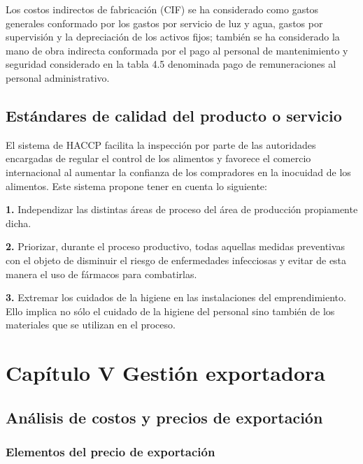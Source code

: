 \documentclass[
  stu,
  floatsintext,
  longtable,
  a4paper,
  nolmodern,
  notxfonts,
  notimes,
  12pt,
  colorlinks=true,linkcolor=blue,citecolor=blue,urlcolor=blue]{apa7}
\begin{document}
Los costos indirectos de fabricación (CIF) se ha considerado como gastos
generales conformado por los gastos por servicio de luz y agua, gastos
por supervisión y la depreciación de los activos fijos; también se ha
considerado la mano de obra indirecta conformada por el pago al personal
de mantenimiento y seguridad considerado en la tabla 4.5 denominada pago
de remuneraciones al personal administrativo.

\subsection{Estándares de calidad del producto o
servicio}\label{estuxe1ndares-de-calidad-del-producto-o-servicio}

El sistema de HACCP facilita la inspección por parte de las autoridades
encargadas de regular el control de los alimentos y favorece el comercio
internacional al aumentar la confianza de los compradores en la
inocuidad de los alimentos. Este sistema propone tener en cuenta lo
siguiente:

\textbf{1.} Independizar las distintas áreas de proceso del área de
producción propiamente dicha.

\textbf{2.} Priorizar, durante el proceso productivo, todas aquellas
medidas preventivas con el objeto de disminuir el riesgo de enfermedades
infecciosas y evitar de esta manera el uso de fármacos para combatirlas.

\textbf{3.} Extremar los cuidados de la higiene en las instalaciones del
emprendimiento. Ello implica no sólo el cuidado de la higiene del
personal sino también de los materiales que se utilizan en el proceso.

\section{Capítulo V Gestión
exportadora}\label{capuxedtulo-v-gestiuxf3n-exportadora}

\subsection{Análisis de costos y precios de
exportación}\label{anuxe1lisis-de-costos-y-precios-de-exportaciuxf3n}

\subsubsection{Elementos del precio de
exportación}\label{elementos-del-precio-de-exportaciuxf3n}
\end{document}
